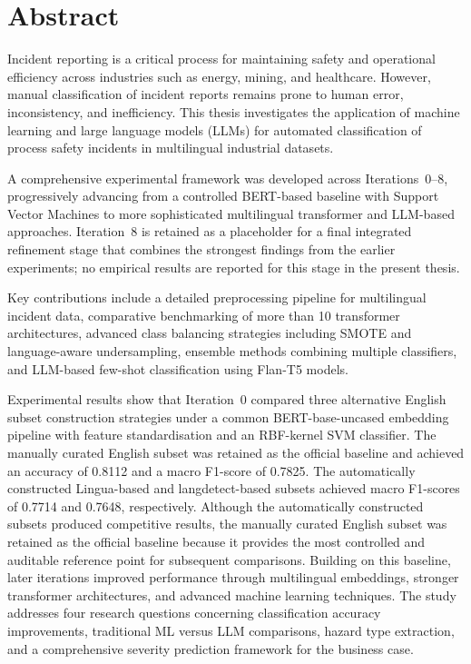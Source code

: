 \documentclass[11pt, titlepage, bibliography=totoc]{scrreprt}
\begin{document}
\chapter*{Abstract}

Incident reporting is a critical process for maintaining safety and operational efficiency across industries such as energy, mining, and healthcare. However, manual classification of incident reports remains prone to human error, inconsistency, and inefficiency. This thesis investigates the application of machine learning and large language models (LLMs) for automated classification of process safety incidents in multilingual industrial datasets.

A comprehensive experimental framework was developed across Iterations~0--8, progressively advancing from a controlled BERT-based baseline with Support Vector Machines to more sophisticated multilingual transformer and LLM-based approaches. Iteration~8 is retained as a placeholder for a final integrated refinement stage that combines the strongest findings from the earlier experiments; no empirical results are reported for this stage in the present thesis.

Key contributions include a detailed preprocessing pipeline for multilingual incident data, comparative benchmarking of more than 10 transformer architectures, advanced class balancing strategies including SMOTE and language-aware undersampling, ensemble methods combining multiple classifiers, and LLM-based few-shot classification using Flan-T5 models.


Experimental results show that Iteration~0 compared three alternative English subset construction strategies under a common BERT-base-uncased embedding pipeline with feature standardisation and an RBF-kernel SVM classifier. The manually curated English subset was retained as the official baseline and achieved an accuracy of 0.8112 and a macro F1-score of 0.7825. The automatically constructed Lingua-based and langdetect-based subsets achieved macro F1-scores of 0.7714 and 0.7648, respectively. Although the automatically constructed subsets produced competitive results, the manually curated English subset was retained as the official baseline because it provides the most controlled and auditable reference point for subsequent comparisons. Building on this baseline, later iterations improved performance through multilingual embeddings, stronger transformer architectures, and advanced machine learning techniques. The study addresses four research questions concerning classification accuracy improvements, traditional ML versus LLM comparisons, hazard type extraction, and a comprehensive severity prediction framework for the business case.
\end{document}
